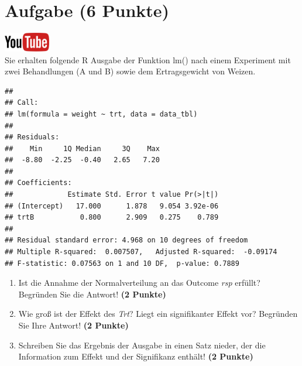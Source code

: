 \documentclass[a4paper, 10pt]{scrartcl}\usepackage[]{graphicx}\usepackage[]{xcolor}
\makeatletter
\newenvironment{kframe}{%
 \def\at@end@of@kframe{}%
 \ifinner\ifhmode%
  \def\at@end@of@kframe{\end{minipage}}%
  \begin{minipage}{\columnwidth}%
 \fi\fi%
 \def\FrameCommand##1{\hskip\@totalleftmargin \hskip-\fboxsep
 \colorbox{shadecolor}{##1}\hskip-\fboxsep
     \hskip-\linewidth \hskip-\@totalleftmargin \hskip\columnwidth}%
 \MakeFramed {\advance\hsize-\width
   \@totalleftmargin\z@ \linewidth\hsize
   \@setminipage}}%
 {\par\unskip\endMakeFramed%
 \at@end@of@kframe}
\newenvironment{knitrout}{}{} %
\makeatother
\begin{document}
\section{Aufgabe \hfill (6 Punkte)}

\hfill\href{https://youtu.be/tNNzcndrpSk}{\includegraphics[width =
  2cm]{img/youtube}}\\[1Ex]

Sie erhalten folgende R Ausgabe der Funktion lm() nach einem Experiment mit
zwei Behandlungen (A und B) sowie dem Ertragsgewicht von Weizen.

\begin{knitrout}
\color{fgcolor}\begin{kframe}
\begin{verbatim}
## 
## Call:
## lm(formula = weight ~ trt, data = data_tbl)
## 
## Residuals:
##    Min     1Q Median     3Q    Max 
##  -8.80  -2.25  -0.40   2.65   7.20 
## 
## Coefficients:
##             Estimate Std. Error t value Pr(>|t|)
## (Intercept)   17.000      1.878   9.054 3.92e-06
## trtB           0.800      2.909   0.275    0.789
## 
## Residual standard error: 4.968 on 10 degrees of freedom
## Multiple R-squared:  0.007507,	Adjusted R-squared:  -0.09174 
## F-statistic: 0.07563 on 1 and 10 DF,  p-value: 0.7889
\end{verbatim}
\end{kframe}
\end{knitrout}


\begin{enumerate}
\item Ist die Annahme der Normalverteilung an das Outcome \textit{rsp} erf{\"u}llt?
  Begr{\"u}nden Sie die Antwort! \textbf{(2 Punkte)}
\item Wie gro{\ss} ist der Effekt des \textit{Trt}? Liegt ein signifikanter
  Effekt vor? Begr{\"u}nden Sie Ihre Antwort! \textbf{(2 Punkte)}
\item Schreiben Sie das Ergebnis der \Rlogo Ausgabe in einen Satz nieder, der die
  Information zum Effekt und der Signifikanz enth{\"a}lt! \textbf{(2 Punkte)} 
\end{enumerate}
 
\clearpage
\end{document}
